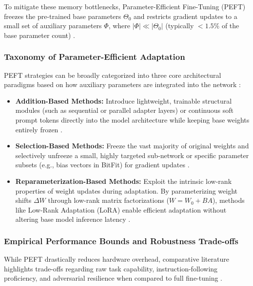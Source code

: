 \documentclass[conference]{IEEEtran}
\begin{document}
To mitigate these memory bottlenecks, Parameter-Efficient Fine-Tuning (PEFT) freezes the pre-trained base parameters $\Theta_0$ and restricts gradient updates to a small set of auxiliary parameters $\Phi$, where $|\Phi| \ll |\Theta_0|$ (typically $< 1.5\%$ of the base parameter count) \cite{nwaiwu2025peft, mohammed2026deepfake}. 

\subsubsection{Taxonomy of Parameter-Efficient Adaptation}
PEFT strategies can be broadly categorized into three core architectural paradigms based on how auxiliary parameters are integrated into the network \cite{liu-etal-2026-look}:
\begin{itemize}
    \item \textbf{Addition-Based Methods:} Introduce lightweight, trainable structural modules (such as sequential or parallel adapter layers) or continuous soft prompt tokens directly into the model architecture while keeping base weights entirely frozen \cite{liu-etal-2026-look}.
    \item \textbf{Selection-Based Methods:} Freeze the vast majority of original weights and selectively unfreeze a small, highly targeted sub-network or specific parameter subsets (e.g., bias vectors in BitFit) for gradient updates \cite{liu-etal-2026-look}.
    \item \textbf{Reparameterization-Based Methods:} Exploit the intrinsic low-rank properties of weight updates during adaptation. By parameterizing weight shifts $\Delta W$ through low-rank matrix factorizations ($W = W_0 + B A$), methods like Low-Rank Adaptation (LoRA) enable efficient adaptation without altering base model inference latency \cite{nwaiwu2025peft, liu-etal-2026-look}.
\end{itemize}

\subsubsection{Empirical Performance Bounds and Robustness Trade-offs}
While PEFT drastically reduces hardware overhead, comparative literature highlights trade-offs regarding raw task capability, instruction-following proficiency, and adversarial resilience when compared to full fine-tuning \cite{liu-etal-2026-look}. 
\end{document}
